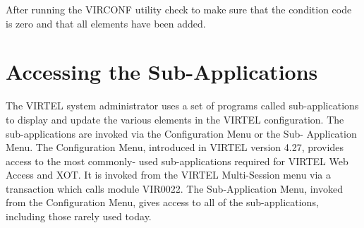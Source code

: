 \documentclass[letterpaper,10pt,english]{sphinxmanual}
\begin{document}
\begin{sphinxVerbatim}[commandchars=\\\{\}]
                                                     
                             
                                                        
                                                      
                                                          
                                                            
                                                   
                                                       
                                                           
                                                         
                                                         
\end{sphinxVerbatim}


After running the VIRCONF utility check to make sure that the condition code is zero and that all elements have been added.

\newpage


\section{Accessing the Sub-Applications}
\label{\detokenize{connectivity_guide:accessing-the-sub-applications}}
The VIRTEL system administrator uses a set of programs called sub-applications to display and update the various elements in the VIRTEL configuration. The sub-applications are invoked via the Configuration Menu or the Sub- Application Menu. The Configuration Menu, introduced in VIRTEL version 4.27, provides access to the most commonly- used sub-applications required for VIRTEL Web Access and XOT. It is invoked from the VIRTEL Multi-Session menu via a transaction which calls module VIR0022. The Sub-Application Menu,
invoked from the Configuration Menu, gives access to all of the sub-applications, including those rarely used today.
\end{document}
